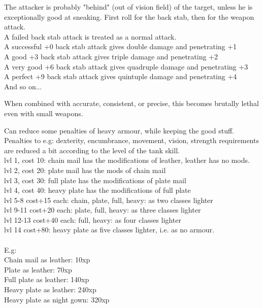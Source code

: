 The attacker is probably "behind" (out of vision field) of the target, unless he is exceptionally good at sneaking. First roll for the back stab, then for the weapon attack.\\ %
A failed back stab attack is treated as a normal attack.\\
A successful +0 back stab attack gives double damage and penetrating +1 \\
A good +3 back stab attack gives triple damage and penetrating +2 \\
A very good +6 back stab attack gives quadruple damage and penetrating +3 \\
A perfect +9 back stab attack gives quintuple damage and penetrating +4 \\
And so on...

When combined with accurate, consistent, or precise, this becomes brutally lethal even with small weapons.


 Can reduce some penalties of heavy armour, while keeping the good stuff. Penalties to e.g: dexterity, encumbrance, movement, vision, strength requirements are reduced a bit according to the level of the tank skill.\\
lvl 1, cost 10: chain mail has the modifications of leather, leather has no mods. \\
lvl 2, cost 20: plate mail has the mods of chain mail \\
lvl 3, cost 30: full plate has the modifications of plate mail \\
lvl 4, cost 40: heavy plate has the modifications of full plate \\
lvl 5-8 cost+15 each: chain, plate, full, heavy: as two classes lighter \\
lvl 9-11 cost+20 each: plate, full, heavy: as three classes lighter \\
lvl 12-13 cost+40 each: full, heavy: as four classes lighter \\
lvl 14 cost+80: heavy plate as five classes lighter, i.e. as no armour.\\
\\
E.g:\\
Chain mail as leather: 10xp\\
Plate as leather: 70xp\\          %
Full plate as leather: 140xp\\    %
Heavy plate as leather: 240xp\\   %
Heavy plate as night gown: 320xp

